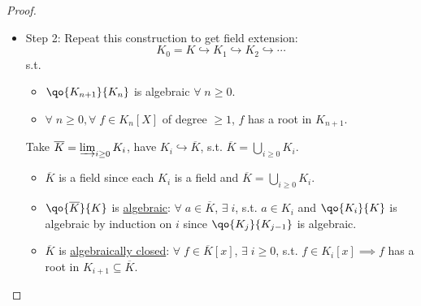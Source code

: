 \begin{proof}
\begin{itemize}
		      \begin{note}
			      \( \qo{K_1}{K} \) is algebraic. By the following:
			      \[
				      \begin{cases}
					      K_1 = K(\overline{y_f} \; ; \; f \in A) \\
					      \text{Each } \overline{y_f} \text{ is algebraic over } K
				      \end{cases}
				      \implies \qo{K_1}{K} \text{ is algebraic.}
			      \]
		      \end{note}
		\item Step 2: Repeat this construction to get field extension:
		      \[
			      K_0 = K \hookrightarrow K_1 \hookrightarrow K_2 \hookrightarrow \cdots
		      \]
		      s.t.
		      \begin{itemize}
			      \item \( \qo{K_{n+1}}{K_n} \) is algebraic \( \forall \; n \geq 0 \).
			      \item \( \forall \; n \geq 0, \forall \; f \in K_n[X] \) of degree \( \geq 1 \), \( f \)
			            has a root in \( K_{n+1} \).
		      \end{itemize}
		      Take \( \overline{K} = \varinjlim_{i\geq 0} K_i \), have \( K_i \hookrightarrow
		      \overline{K} \), s.t. \( \overline{K} = \bigcup_{i \geq 0} K_i \).
		      \begin{itemize}
			      \item \( \overline{K} \) is a field since each \( K_i \) is a field and \( \overline{K} = \bigcup_{i\geq 0} K_i \).
			      \item \( \qo{\overline{K}}{K} \) is \underline{algebraic}: \( \forall \; a \in \overline
			            K\), \( \exists \; i \), s.t. \( a\in K_i \) and \( \qo{K_i}{K} \) is algebraic by
			            induction on \( i \) since \( \qo{K_j}{K_{j-1}} \) is algebraic.
			      \item \( \overline K \) is \underline{algebraically closed}: \( \forall \; f \in
			            \overline K[x] \), \( \exists \; i \geq 0 \), s.t. \( f\in K_i [x]  \implies f\) has a
			            root in \( K_{i+1} \subseteq \overline K \).
		      \end{itemize}
	\end{itemize}
\end{proof}

